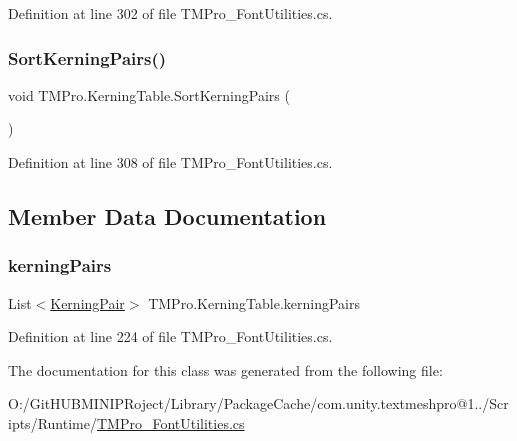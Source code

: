 Definition at line 302 of file T\+M\+Pro\+\_\+\+Font\+Utilities.\+cs.

\mbox{\label{class_t_m_pro_1_1_kerning_table_a0d83761d66f1df6a94704d50363347d5}} 
\subsubsection{\texorpdfstring{SortKerningPairs()}{SortKerningPairs()}}
{\footnotesize\ttfamily void T\+M\+Pro.\+Kerning\+Table.\+Sort\+Kerning\+Pairs (\begin{DoxyParamCaption}{ }\end{DoxyParamCaption})}



Definition at line 308 of file T\+M\+Pro\+\_\+\+Font\+Utilities.\+cs.



\subsection{Member Data Documentation}
\mbox{\label{class_t_m_pro_1_1_kerning_table_a6f730e99745068724bd59af38b2a999c}} 
\subsubsection{\texorpdfstring{kerningPairs}{kerningPairs}}
{\footnotesize\ttfamily List$<$\mbox{\hyperlink{class_t_m_pro_1_1_kerning_pair}{Kerning\+Pair}}$>$ T\+M\+Pro.\+Kerning\+Table.\+kerning\+Pairs}



Definition at line 224 of file T\+M\+Pro\+\_\+\+Font\+Utilities.\+cs.



The documentation for this class was generated from the following file\+:\begin{DoxyCompactItemize}
\item 
O\+:/\+Git\+H\+U\+B\+M\+I\+N\+I\+P\+Roject/\+Library/\+Package\+Cache/com.\+unity.\+textmeshpro@1../\+Scripts/\+Runtime/\mbox{\hyperlink{_t_m_pro___font_utilities_8cs}{T\+M\+Pro\+\_\+\+Font\+Utilities.\+cs}}\end{DoxyCompactItemize}
